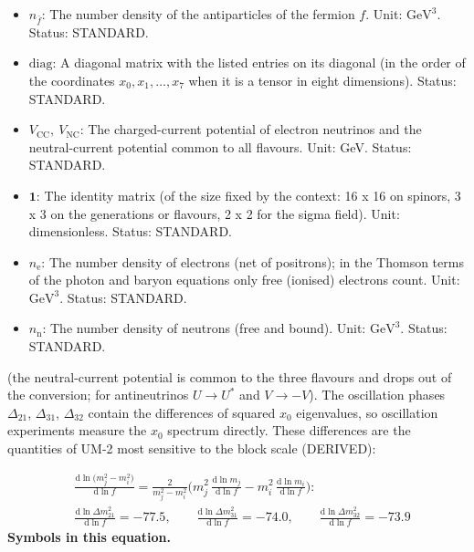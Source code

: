 \documentclass[
  10pt,
]{article}
\begin{document}
\begin{itemize}
  particle density of dirac16complex in the Kohn-Sham equations and
  \(n_o\) the contribution of the orbital \(o\), \(n_{\psi i}(y)\) the
  density of the Standard-Model fermion \(\psi_i\) (per proper 7-volume
  of eight dimensions); \(n_f\) the density of the fermion component
  \(f\) and \(n_i\) that of the neutrino mass state \(i\) (per 3-volume
  of four dimensions). Unit: \(\mathrm{GeV}^{7}\) (eight dimensions),
  \(\mathrm{GeV}^{3}\) (four dimensions). Status: STANDARD.
\item
  \(n_{\bar f}\): The number density of the antiparticles of the fermion
  \(f\). Unit: \(\mathrm{GeV}^{3}\). Status: STANDARD.
\item
  \(\mathrm{diag}\): A diagonal matrix with the listed entries on its
  diagonal (in the order of the coordinates \(x_0, x_1, \dots, x_7\)
  when it is a tensor in eight dimensions). Status: STANDARD.
\item
  \(V_{\mathrm{CC}},\ V_{\mathrm{NC}}\): The charged-current potential
  of electron neutrinos and the neutral-current potential common to all
  flavours. Unit: GeV. Status: STANDARD.
\item
  \(\mathbf{1}\): The identity matrix (of the size fixed by the context:
  16 x 16 on spinors, 3 x 3 on the generations or flavours, 2 x 2 for
  the sigma field). Unit: dimensionless. Status: STANDARD.
\item
  \(n_{\mathrm{e}}\): The number density of electrons (net of
  positrons); in the Thomson terms of the photon and baryon equations
  only free (ionised) electrons count. Unit: \(\mathrm{GeV}^{3}\).
  Status: STANDARD.
\item
  \(n_{\mathrm{n}}\): The number density of neutrons (free and bound).
  Unit: \(\mathrm{GeV}^{3}\). Status: STANDARD.
\end{itemize}

(the neutral-current potential is common to the three flavours and drops
out of the conversion; for antineutrinos \(U \to U^*\) and
\(V \to -V\)). The oscillation phases \(\Delta_{21}\), \(\Delta_{31}\),
\(\Delta_{32}\) contain the differences of squared \(x_0\) eigenvalues,
so oscillation experiments measure the \(x_0\) spectrum directly. These
differences are the quantities of UM-2 most sensitive to the block scale
(DERIVED):

\[ \begin{aligned} &\frac{\mathrm{d}\ln\big(m_j^2 - m_i^2\big)}{\mathrm{d}\ln f} = \frac{2}{m_j^2 - m_i^2}\Big(m_j^2\,\frac{\mathrm{d}\ln m_j}{\mathrm{d}\ln f} - m_i^2\,\frac{\mathrm{d}\ln m_i}{\mathrm{d}\ln f}\Big):\\
&\frac{\mathrm{d}\ln\Delta m_{21}^2}{\mathrm{d}\ln f} = -77.5,\qquad \frac{\mathrm{d}\ln\Delta m_{31}^2}{\mathrm{d}\ln f} = -74.0,\qquad \frac{\mathrm{d}\ln\Delta m_{32}^2}{\mathrm{d}\ln f} = -73.9 \end{aligned} \]
\textbf{Symbols in this equation.}
\end{document}
